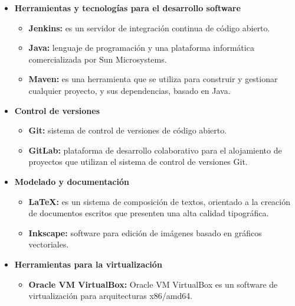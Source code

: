 \documentclass{pre-tfg}
\begin{document}
\begin{itemize}
\item \textbf{Herramientas y tecnologías para el desarrollo software}
\begin{itemize}
\item \textbf{Jenkins: }es un servidor de integración continua de código abierto. \cite{Jenkins}
\end{itemize}
\begin{itemize}
\item \textbf{Java: }lenguaje de programación y una plataforma informática comercializada por Sun Microsystems. \cite{Java}
\end{itemize}
\begin{itemize}
\item \textbf{Maven: }es una herramienta que se utiliza para construir y gestionar cualquier proyecto, y sus dependencias, basado en Java.
\end{itemize}
\end{itemize}

\begin{itemize}
\item \textbf{Control de versiones}
\begin{itemize}
\item \textbf{Git:} sistema de control de versiones de código abierto. \cite{Git}
\item \textbf{GitLab:} plataforma de desarrollo colaborativo para el alojamiento de proyectos que utilizan el sistema de control de versiones Git. \cite{GitLab}
\end{itemize}
\end{itemize}

\begin{itemize}
\item \textbf{Modelado y documentación}
\begin{itemize}
\item \textbf{\LaTeX: }es un sistema de composición de textos, orientado a la creación de documentos escritos que presenten una alta calidad tipográfica. \cite{LaTeX}
\item \textbf{Inkscape: }software para edición de imágenes basado en gráficos vectoriales. \cite{Inkscape}
\end{itemize}
\end{itemize}

\begin{itemize}
\item \textbf{Herramientas para la virtualización}
\begin{itemize}
\item \textbf{Oracle VM VirtualBox: }Oracle VM VirtualBox es un software de virtualización para arquitecturas x86/amd64.
\end{itemize}
\end{itemize}
\end{document}
